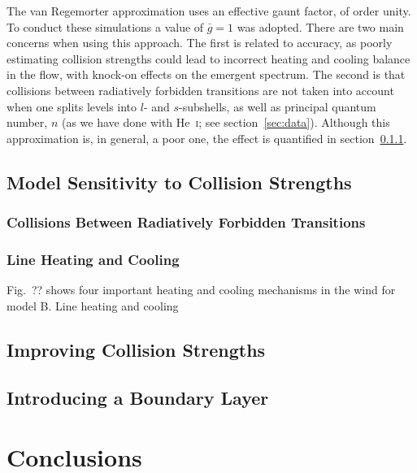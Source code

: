 The van Regemorter approximation uses an effective gaunt factor, of
order unity. To conduct these simulations a value of $\bar{g}=1$ 
was adopted. There are two main concerns when using this approach.
The first is related to accuracy, as poorly estimating collision strengths
could lead to incorrect heating and cooling balance in the flow, with
knock-on effects on the emergent spectrum. The second is that 
collisions between radiatively forbidden transitions are not taken into 
account when one splits levels into $l$- and $s$-subshells, as well
as principal quantum number, $n$ (as we have done with He~\textsc{i}; 
see section~\ref{sec:data}). Although this approximation is, in general, 
a poor one, the effect is quantified in section~\ref{sec:rad_forbid}.

\subsection{Model Sensitivity to Collision Strengths}

\subsubsection{Collisions Between Radiatively Forbidden Transitions}
\label{sec:rad_forbid}

\subsubsection{Line Heating and Cooling}
\label{sec:line_heat}

Fig.~?? shows four important heating and cooling mechanisms 
in the wind for model B. Line heating and cooling 

\subsection{Improving Collision Strengths}


\subsection{Introducing a Boundary Layer}



%
%


\section{Conclusions}

